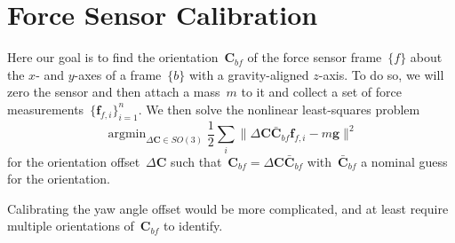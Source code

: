 \documentclass{article}
\DeclareMathOperator*{\argmin}{argmin}
\begin{document}
\section{Force Sensor Calibration}

Here our goal is to find the orientation~$\bm{C}_{bf}$ of the force sensor
frame~$\{f\}$ about the $x$- and $y$-axes of a frame~$\{b\}$ with a gravity-aligned
$z$-axis. To do so, we will zero the sensor and then attach a mass~$m$ to it
and collect a set of force measurements~$\{\bm{f}_{f,i}\}_{i=1}^n$. We then
solve the nonlinear least-squares problem
\begin{equation*}
  \argmin_{\Delta\bm{C}\in SO(3)} \frac{1}{2}\sum_i\|\Delta\bm{C}\bar{\bm{C}}_{bf}\bm{f}_{f,i}-m\bm{g}\|^2
\end{equation*}
for the orientation offset~$\Delta\bm{C}$ such
that~$\bm{C}_{bf}=\Delta\bm{C}\bar{\bm{C}}_{bf}$ with~$\bar{\bm{C}}_{bf}$ a
nominal guess for the orientation.

Calibrating the yaw angle offset would be more complicated, and at least
require multiple orientations of~$\bm{C}_{bf}$ to identify.

\end{document}
